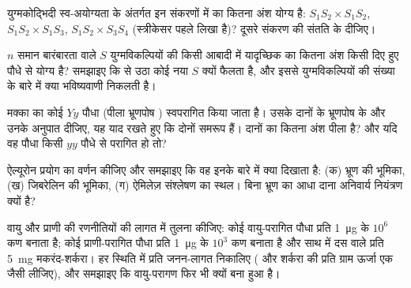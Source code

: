 \begin{exercise}[$\star\star$]\label{exo:b2:angiosperm-reproduction:6}
युग्मकोद्भिदी स्व-अयोग्यता के अंतर्गत इन संकरणों में  का कितना अंश
योग्य है: $S_1S_2\times S_1S_2$, $S_1S_2\times
S_1S_3$, $S_1S_2\times S_3S_4$ (स्त्रीकेसर पहले लिखा है)? दूसरे संकरण
की संतति के  दीजिए।
\end{exercise}

\begin{exercise}[$\star\star$]\label{exo:b2:angiosperm-reproduction:7}
$n$ समान बारंबारता वाले $S$ युग्मविकल्पियों की किसी आबादी में यादृच्छिक
 का कितना अंश किसी दिए हुए पौधे से योग्य है? समझाइए कि  से
उठा कोई नया $S$  क्यों फैलता है, और इससे
युग्मविकल्पियों की संख्या के बारे में क्या भविष्यवाणी निकलती है।
\end{exercise}

\begin{exercise}[$\star\star$]\label{exo:b2:angiosperm-reproduction:8}
मक्का का कोई  $Yy$ पौधा (पीला भ्रूणपोष )
स्वपरागित किया जाता है। उसके दानों के भ्रूणपोष के  और उनके
अनुपात दीजिए, यह याद रखते हुए कि दोनों  समरूप हैं।
दानों का कितना अंश पीला है? और यदि वह पौधा किसी $yy$ पौधे से परागित हो
तो?
\end{exercise}

\begin{exercise}[$\star\star$]\label{exo:b2:angiosperm-reproduction:9}
ऐल्यूरोन प्रयोग का वर्णन कीजिए और समझाइए कि वह इनके बारे में क्या
दिखाता है: (क) भ्रूण की भूमिका, (ख) जिबरेलिन की भूमिका, (ग) ऐमिलेज़
संश्लेषण का स्थल। बिना भ्रूण का आधा दाना अनिवार्य नियंत्रण क्यों है?
\end{exercise}

\begin{exercise}[$\star\star\star$]\label{exo:b2:angiosperm-reproduction:10}
वायु और प्राणी की रणनीतियों की लागत में तुलना कीजिए: कोई वायु-परागित
पौधा प्रति  \qty{1}{\micro g} के $10^{6}$ कण बनाता है; कोई
प्राणी-परागित पौधा प्रति  \qty{1}{\micro g} के $10^{3}$ कण
बनाता है और साथ में दस  वाले प्रति  \qty{5}{mg} मकरंद-शर्करा।
हर स्थिति में प्रति  जनन-लागत निकालिए
( और शर्करा की प्रति ग्राम ऊर्जा एक जैसी लीजिए), और समझाइए कि
वायु-परागण फिर भी क्यों बना हुआ है।
\end{exercise}

